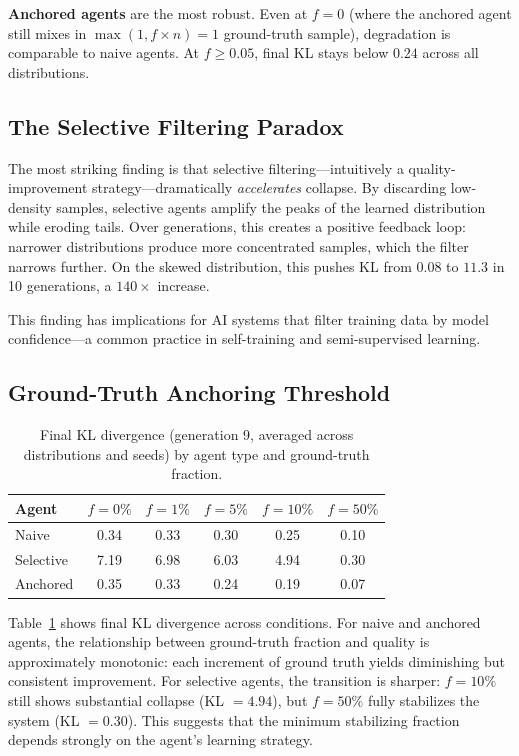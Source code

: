 \documentclass[11pt]{article}
\begin{document}
\textbf{Anchored agents} are the most robust.
Even at $f=0$ (where the anchored agent still mixes in $\max(1, f \times n) = 1$ ground-truth sample), degradation is comparable to naive agents.
At $f \geq 0.05$, final KL stays below $0.24$ across all distributions.

\subsection{The Selective Filtering Paradox}

The most striking finding is that selective filtering---intuitively a quality-improvement strategy---dramatically \emph{accelerates} collapse.
By discarding low-density samples, selective agents amplify the peaks of the learned distribution while eroding tails.
Over generations, this creates a positive feedback loop: narrower distributions produce more concentrated samples, which the filter narrows further.
On the skewed distribution, this pushes KL from $0.08$ to $11.3$ in 10 generations, a $140\times$ increase.

This finding has implications for AI systems that filter training data by model confidence---a common practice in self-training and semi-supervised learning.

\subsection{Ground-Truth Anchoring Threshold}

\begin{table}[t]
\centering
\caption{Final KL divergence (generation 9, averaged across distributions and seeds) by agent type and ground-truth fraction.}
\label{tab:kl_summary}
\begin{tabular}{lccccc}
\toprule
Agent & $f=0\%$ & $f=1\%$ & $f=5\%$ & $f=10\%$ & $f=50\%$ \\
\midrule
Naive     & 0.34 & 0.33 & 0.30 & 0.25 & 0.10 \\
Selective & 7.19 & 6.98 & 6.03 & 4.94 & 0.30 \\
Anchored  & 0.35 & 0.33 & 0.24 & 0.19 & 0.07 \\
\bottomrule
\end{tabular}
\end{table}

Table~\ref{tab:kl_summary} shows final KL divergence across conditions.
For naive and anchored agents, the relationship between ground-truth fraction and quality is approximately monotonic: each increment of ground truth yields diminishing but consistent improvement.
For selective agents, the transition is sharper: $f=10\%$ still shows substantial collapse (KL $= 4.94$), but $f=50\%$ fully stabilizes the system (KL $= 0.30$).
This suggests that the minimum stabilizing fraction depends strongly on the agent's learning strategy.
\end{document}
